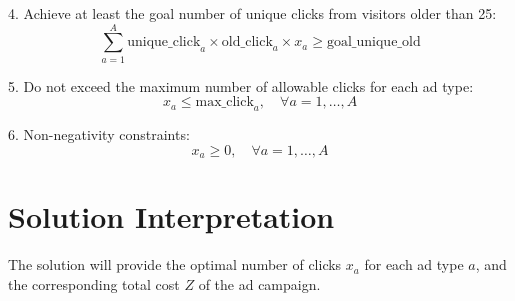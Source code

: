 \documentclass{article}
\begin{document}
4. Achieve at least the goal number of unique clicks from visitors older than 25:
   \[
   \sum_{a=1}^{A} \text{unique\_click}_a \times \text{old\_click}_a \times x_a \geq \text{goal\_unique\_old}
   \]

5. Do not exceed the maximum number of allowable clicks for each ad type:
   \[
   x_a \leq \text{max\_click}_a, \quad \forall a = 1, \ldots, A
   \]

6. Non-negativity constraints:
   \[
   x_a \geq 0, \quad \forall a = 1, \ldots, A
   \]

\section{Solution Interpretation}
The solution will provide the optimal number of clicks \( x_a \) for each ad type \( a \), and the corresponding total cost \( Z \) of the ad campaign.
\end{document}
